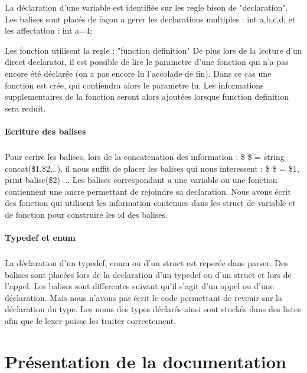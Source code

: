\documentclass{report}
\begin{document}
{{{{			La déclaration d'une variable est identifiée sur les regle bison de "declaration". Les balises sont placés de façon a gerer les declarations multiples : int a,b,c,d;
			et les affectation : int a=4;
			
			Les fonction utilisent la regle : "function definition"
			De plus lors de la lecture d'un direct declarator, il est possible de lire le parametre d'une fonction qui n'a pas encore été déclarée (on a pas encore lu l'accolade de fin). Dans ce cas
			une fonction est crée, qui contiendra alors le parametre lu. Les informations supplementaires de la fonction seront alors ajoutées lorsque function definition sera reduit.
			}
			\subsubsection{Ecriture des balises}{
			\paragraph{}{
			Pour ecrire les balises, lors de la concatenation des information : \$ \$ = string concat(\$1,\$2,..), 
			il nous suffit de placer les balises qui nous interessent : \$ \$ = \$1, print balise(\$2) ...
			Les balises correspondant a une variable ou une fonction contiennent une ancre permettant de rejoindre sa declaration. Nous avons écrit des fonction qui utilisent les information
			contenues dans les struct de variable et de fonction pour construire les id des balises. 	
		}
		}
		\subsubsection{Typedef et enum}{
		\paragraph{}{
			La déclaration d'un typedef, enum ou d'un struct est reperée dans parser. Des balises sont placées lors de la declaration d'un typedef ou d'un struct et lors de l'appel. Les balises 
			sont differentes suivant qu'il s'agit d'un appel ou d'une déclaration. Mais nous n'avons pas écrit le code permettant de revenir sur la déclaration du type.
			Les noms des types déclarés ainsi sont stockés dans des listes afin que le lexer puisse les traiter correctement.
				
			}
			}
			}
			}
\chapter{Présentation de la documentation}
}
\end{document}

